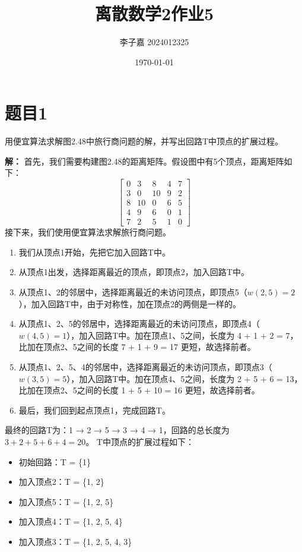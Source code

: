 \documentclass[utf8]{ctexart}
\title{\textbf{离散数学2\quad 作业5}}
\date{\today}
\author{李子嘉 2024012325}
\theoremstyle{mystyle}
\begin{document}
\maketitle

\section*{题目1}

\begin{problembox}
用便宜算法求解图2.48中旅行商问题的解，并写出回路T中顶点的扩展过程。
\end{problembox}
\textbf{解：} 首先，我们需要构建图2.48的距离矩阵。假设图中有5个顶点，距离矩阵如下：
$$
\begin{bmatrix}
0 & 3 & 8 & 4 & 7 \\
3 & 0 & 10 & 9 & 2 \\
8 & 10 & 0 & 6 & 5 \\
4 & 9 & 6 & 0 & 1 \\
7 & 2 & 5 & 1 & 0
\end{bmatrix}
$$
接下来，我们使用便宜算法求解旅行商问题。

\begin{enumerate}
    \item 我们从顶点1开始，先把它加入回路T中。
    \item 从顶点1出发，选择距离最近的顶点，即顶点2，加入回路T中。
    \item 从顶点1、2的邻居中，选择距离最近的未访问顶点，即顶点5（$w(2,5)=2$），加入回路T中，由于对称性，加在顶点2的两侧是一样的。
    \item 从顶点1、2、5的邻居中，选择距离最近的未访问顶点，即顶点4（$w(4,5)=1$），加入回路T中。加在顶点1、5之间，长度为 4 + 1 + 2 = 7，比加在顶点2、5之间的长度 7 + 1 + 9 = 17 更短，故选择前者。
    \item 从顶点1、2、5、4的邻居中，选择距离最近的未访问顶点，即顶点3（$w(3,5)=5$），加入回路T中。加在顶点4、5之间，长度为 2 + 5 + 6 = 13，比加在顶点2、5之间的长度 1 + 5 + 10 = 16 更短，故选择前者。
    \item 最后，我们回到起点顶点1，完成回路T。
\end{enumerate}
最终的回路T为：1 → 2 → 5 → 3 → 4 → 1，回路的总长度为 $3 + 2 + 5 + 6 + 4 = 20$。
T中顶点的扩展过程如下：
\begin{itemize}
    \item 初始回路：T = \{1\}
    \item 加入顶点2：T = \{1, 2\}
    \item 加入顶点5：T = \{1, 2, 5\}
    \item 加入顶点4：T = \{1, 2, 5, 4\}
    \item 加入顶点3：T = \{1, 2, 5, 4, 3\}
\end{itemize}
\end{document}
